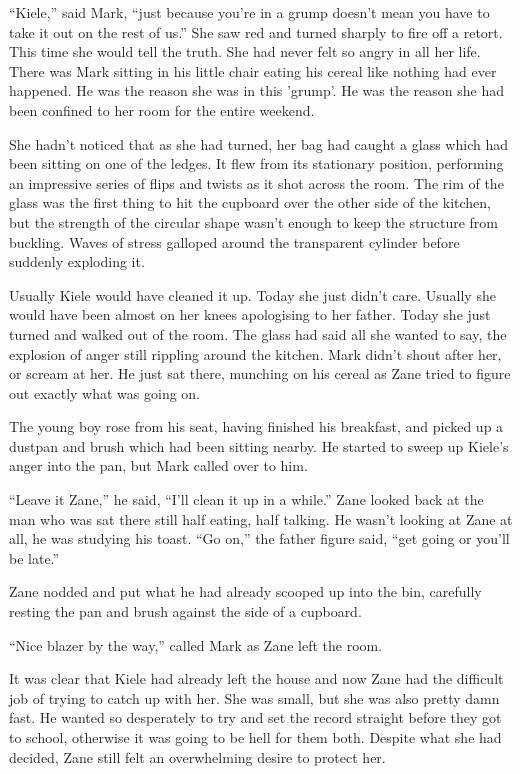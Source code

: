 ``Kiele,'' said Mark, ``just because you're in a grump doesn't mean you have to take it out on the rest of us.''  She saw red and turned sharply to fire off a retort.  This time she would tell the truth.  She had never felt so angry in all her life.  There was Mark sitting in his little chair eating his cereal like nothing had ever happened.  He was the reason she was in this 'grump'.  He was the reason she had been confined to her room for the entire weekend.  

She hadn't noticed that as she had turned, her bag had caught a glass which had been sitting on one of the ledges.  It flew from its stationary position, performing an impressive series of flips and twists as it shot across the room.  The rim of the glass was the first thing to hit the cupboard over the other side of the kitchen, but the strength of the circular shape wasn't enough to keep the structure from buckling.  Waves of stress galloped around the transparent cylinder before suddenly exploding it.

Usually Kiele would have cleaned it up.  Today she just didn't care.  Usually she would have been almost on her knees apologising to her father.  Today she just turned and walked out of the room.  The glass had said all she wanted to say, the explosion of anger still rippling around the kitchen.  Mark didn't shout after her, or scream at her.  He just sat there, munching on his cereal as Zane tried to figure out exactly what was going on.

The young boy rose from his seat, having finished his breakfast, and picked up a dustpan and brush which had been sitting nearby.  He started to sweep up Kiele's anger into the pan, but Mark called over to him.

``Leave it Zane,'' he said, ``I'll clean it up in a while.''  Zane looked back at the man who was sat there still half eating, half talking.  He wasn't looking at Zane at all, he was studying his toast.  ``Go on,'' the father figure said, ``get going or you'll be late.''

Zane nodded and put what he had already scooped up into the bin, carefully resting the pan and brush against the side of a cupboard.  

``Nice blazer by the way,'' called Mark as Zane left the room.

It was clear that Kiele had already left the house and now Zane had the difficult job of trying to catch up with her.  She was small, but she was also pretty damn fast.  He wanted so desperately to try and set the record straight before they got to school, otherwise it was going to be hell for them both.  Despite what she had decided, Zane still felt an overwhelming desire to protect her.



